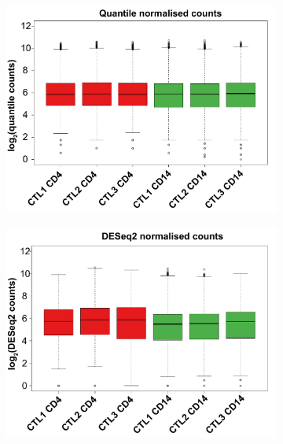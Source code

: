 \begin{figure}[htbp]
\centering
\begin{subfigure}{0.45\textwidth}
\centering
\includegraphics[width=\textwidth]{./Results1/pdfs/ATAC_Core_CD4_CD14_boxplot_80pcnt_cut_off_filtered_quantile_counts}
\caption{\textbf{}}
\end{subfigure}%
\begin{subfigure}{0.45\textwidth}
\centering
\includegraphics[width=\textwidth]{./Results1/pdfs/ATAC_Core_fastq_CD4_CD14_DESeq2_mean_vs_log2sd}
\caption{\textbf{}}
\end{subfigure}
\begin{subfigure}{0.5\textwidth}
\centering

\end{subfigure}
\end{figure}
